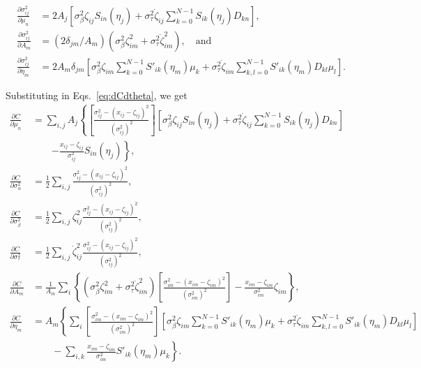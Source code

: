 \documentclass[aps, prb, onecolumn, floatfix, amssymb, superscriptaddress, nofootinbib, longbibliography]{revtex4-2}
\begin{document}
\begin{subequations}
\begin{align}
\frac{\partial\sigma_{ij}^2}{\partial \mu_n} &= 2A_j\left[\sigma_\beta^2\zeta_{ij} S_{in}(\eta_j)+ \sigma_\tau^2\dot{\zeta}_{ij}\sum_{k=0}^{N-1}S_{ik}(\eta_j)D_{kn}\right],\\
\frac{\partial\sigma_{ij}^2}{\partial A_m} &= (2\delta_{jm}/A_m)(\sigma_\beta^2\zeta_{im}^2 + \sigma_\tau^2\dot{\zeta}_{im}^2),\quad\text{and}\\
\frac{\partial\sigma_{ij}^2}{\partial \eta_m} &= 2A_m\delta_{jm}\left[\sigma_\beta^2\zeta_{im}\sum_{k=0}^{N-1} S'_{ik}(\eta_m)\mu_{k} + \sigma_\tau^2\dot{\zeta}_{im}\sum_{k,l=0}^{N-1} S'_{ik}(\eta_m)D_{kl}\mu_{l}\right].
\end{align}
\label{eq:dsigmadmuAeta2}
\end{subequations}

Substituting in Eqs.~\ref{eq:dCdtheta}, we get
\begin{subequations}
\begin{align}
\frac{\partial C}{\partial \mu_n} &= \sum_{i,j}A_j\left\{\left[\frac{\sigma_{ij}^2 - (x_{ij} - \zeta_{ij})^2}{\left(\sigma_{ij}^2\right)^2}\right]\left[\sigma_\beta^2\zeta_{ij} S_{in}(\eta_j)+ \sigma_\tau^2\dot{\zeta}_{ij}\sum_{k=0}^{N-1}S_{ik}(\eta_j)D_{kn}\right] \right.\nonumber\\
&\qquad \left.- \frac{x_{ij} - \zeta_{ij}}{\sigma_{ij}^2}S_{in}(\eta_j)\right\},\\
\frac{\partial C}{\partial \sigma_\alpha^2} &=\frac{1}{2}\sum_{i,j}\frac{\sigma_{ij}^2 - (x_{ij} - \zeta_{ij})^2}{\left(\sigma_{ij}^2\right)^2},\\
\frac{\partial C}{\partial \sigma_\beta^2} &=\frac{1}{2}\sum_{i,j}\zeta_{ij}^2\frac{\sigma_{ij}^2 - (x_{ij} - \zeta_{ij})^2}{\left(\sigma_{ij}^2\right)^2},\\
\frac{\partial C}{\partial \sigma_\tau^2} &=\frac{1}{2}\sum_{i,j}\dot{\zeta}_{ij}^2\frac{\sigma_{ij}^2 - (x_{ij} - \zeta_{ij})^2}{\left(\sigma_{ij}^2\right)^2},\\
\frac{\partial C}{\partial A_m} &= \frac{1}{A_m}\sum_{i}\left\{(\sigma_\beta^2\zeta_{im}^2 + \sigma_\tau^2\dot{\zeta}_{im}^2)\left[\frac{\sigma_{im}^2 - (x_{im} - \zeta_{im})^2}{\left(\sigma_{im}^2\right)^2}\right] - \frac{x_{im} - \zeta_{im}}{\sigma_{im}^2}\zeta_{im}\right\},\\
\frac{\partial C}{\partial \eta_m} &= A_m\left\{\sum_{i}\left[\frac{\sigma_{im}^2 - (x_{im} - \zeta_{im})^2}{\left(\sigma_{im}^2\right)^2}\right]\left[\sigma_\beta^2\zeta_{im}\sum_{k=0}^{N-1} S'_{ik}(\eta_m)\mu_{k} + \sigma_\tau^2\dot{\zeta}_{im}\sum_{k,l=0}^{N-1} S'_{ik}(\eta_m)D_{kl}\mu_{l}\right]\right. \nonumber\\
&\qquad - \left.\sum_{i,k}\frac{x_{im} - \zeta_{im}}{\sigma_{im}^2}S'_{ik}(\eta_m)\mu_{k}\right\}.
\end{align}
\end{subequations}



\end{document}
